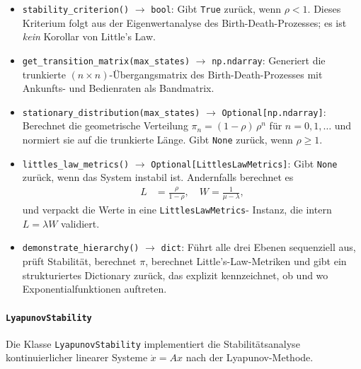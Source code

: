 ﻿\documentclass[a4paper,12pt]{scrreprt}
\theoremstyle{definition}
\begin{document}
\begin{itemize}
	\item \texttt{stability\_criterion()} $\to$ \texttt{bool}:
	Gibt \texttt{True} zurück, wenn $\rho < 1$.  Dieses
	Kriterium folgt aus der Eigenwertanalyse des
	Birth-Death-Prozesses; es ist \emph{kein} Korollar von
	Little's Law.
	
	\item \texttt{get\_transition\_matrix(max\_states)} $\to$
	\texttt{np.ndarray}:  Generiert die trunkierte
	$(n \times n)$-Übergangsmatrix des Birth-Death-Prozesses mit
	Ankunfts- und Bedienraten als Bandmatrix.
	
	\item \texttt{stationary\_distribution(max\_states)} $\to$
	\texttt{Optional[np.ndarray]}:  Berechnet die geometrische
	Verteilung $\pi_n = (1-\rho)\,\rho^n$ für $n = 0, 1, \ldots$
	und normiert sie auf die trunkierte Länge.  Gibt
	\texttt{None} zurück, wenn $\rho \geq 1$.
	
	\item \texttt{littles\_law\_metrics()} $\to$
	\texttt{Optional[LittlesLawMetrics]}:  Gibt \texttt{None}
	zurück, wenn das System instabil ist.  Andernfalls berechnet
	es
	\begin{align}
		L &= \frac{\rho}{1-\rho}, \quad
		W  = \frac{1}{\mu - \lambda},
	\end{align}
	und verpackt die Werte in eine \texttt{LittlesLawMetrics}-
	Instanz, die intern \mbox{$L = \lambda W$} validiert.
	
	\item \texttt{demonstrate\_hierarchy()} $\to$ \texttt{dict}:
	Führt alle drei Ebenen sequenziell aus, prüft Stabilität,
	berechnet $\pi$, berechnet Little's-Law-Metriken und gibt
	ein strukturiertes Dictionary zurück, das explizit
	kennzeichnet, ob und wo Exponentialfunktionen auftreten.
\end{itemize}

\paragraph{\texttt{LyapunovStability}}

Die Klasse \texttt{LyapunovStability} implementiert die
Stabilitätsanalyse kontinuierlicher linearer Systeme
$\dot{x} = Ax$ nach der Lyapunov-Methode.
\end{document}
